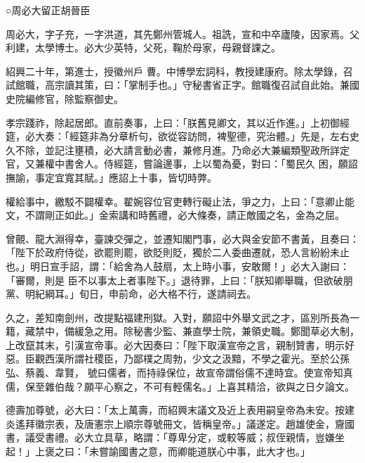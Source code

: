 
\begin{pinyinscope}

 ○周必大留正胡晉臣



 周必大，字子充，一字洪道，其先鄭州管城人。祖詵，宣和中卒廬陵，因家焉。父利建，太學博士。必大少英特，父死，鞠於母家，母親督課之。



 紹興二十年，第進士，授徽州戶
 曹。中博學宏詞科，教授建康府。除太學錄，召試館職，高宗讀其策，曰：「掌制手也。」守秘書省正字。館職復召試自此始。兼國史院編修官，除監察御史。



 孝宗踐祚，除起居郎。直前奏事，上曰：「朕舊見卿文，其以近作進。」上初御經筵，必大奏：「經筵非為分章析句，欲從容訪問，裨聖德，究治體。」先是，左右史久不除，並記注壅積，必大請言動必書，兼修月進。乃命必大兼編類聖政所詳定官，又兼權中書舍人。侍經筵，嘗論邊事，上以蜀為憂，對曰：「蜀民久
 困，願詔撫諭，事定宜寬其賦。」應詔上十事，皆切時弊。



 權給事中，繳駁不闢權幸。翟婉容位官吏轉行礙止法，爭之力，上曰：「意卿止能文，不謂剛正如此。」金索講和時舊禮，必大條奏，請正敵國之名，金為之屈。



 曾覿、龍大淵得幸，臺諫交彈之，並遷知閣門事，必大與金安節不書黃，且奏曰：「陛下於政府侍從，欲罷則罷，欲貶則貶，獨於二人委曲遷就，恐人言紛紛未止也。」明日宣手詔，謂：「給舍為人鼓扇，太上時小事，安敢爾！」必大入謝曰：「審爾，則是
 臣不以事太上者事陛下。」退待罪，上曰：「朕知卿舉職，但欲破朋黨、明紀綱耳。」旬日，申前命，必大格不行，遂請祠去。



 久之，差知南劍州，改提點福建刑獄。入對，願詔中外舉文武之才，區別所長為一籍，藏禁中，備緩急之用。除秘書少監、兼直學士院，兼領史職。鄭聞草必大制，上改竄其末，引漢宣帝事。必大因奏曰：「陛下取漢宣帝之言，親制贊書，明示好惡。臣觀西漢所謂社稷臣，乃鄙樸之周勃，少文之汲黯，不學之霍光。至於公孫弘、蔡義、韋賢，
 號曰儒者，而持祿保位，故宣帝謂俗儒不達時宜。使宣帝知真儒，保至雜伯哉？願平心察之，不可有輕儒名。」上喜其精洽，欲與之日夕論文。



 德壽加尊號，必大曰：「太上萬壽，而紹興末議文及近上表用嗣皇帝為未安。按建炎遙拜徽宗表，及唐憲宗上順宗尊號冊文，皆稱皇帝。」議遂定。趙雄使金，齎國書，議受書禮。必大立具草，略謂：「尊卑分定，或較等威；叔侄親情，豈嫌坐起！」上褒之曰：「未嘗諭國書之意，而卿能道朕心中事，此大才也。」




\end{pinyinscope}
